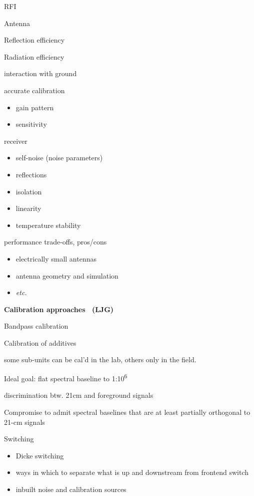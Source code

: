 RFI

Antenna

Reflection efficiency

Radiation efficiency

interaction with ground

accurate calibration

\begin{itemize}
\item
  gain pattern
\item
  sensitivity{~}
\end{itemize}

receiver

\begin{itemize}
\item
  self-noise (noise parameters)
\item
  reflections
\item
  isolation
\item
  linearity
\item
  temperature stability
\end{itemize}

performance trade-offs, pros/cons

\begin{itemize}
\item
  electrically small antennas
\item
  antenna geometry and simulation
\item
  \emph{etc.}
\end{itemize}

\textbf{Calibration approaches{~ }(LJG)}

Bandpass calibration

Calibration of additives

some sub-units can be cal'd in the lab, others only in the field.

Ideal goal: flat spectral baseline to 1:10\textsuperscript{6}{~}

discrimination btw. 21cm and foreground signals

Compromise to admit spectral baselines that are at least partially
orthogonal to 21-cm signals

Switching

\begin{itemize}
\item
  Dicke switching
\item
  ways in which to separate what is up and downstream from frontend
  switch
\item
  inbuilt noise and calibration sources
\end{itemize}

